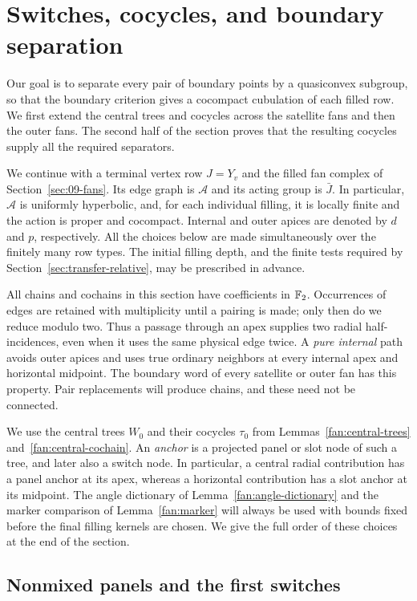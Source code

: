 \section{Switches, cocycles, and boundary separation}\label{sec:10-boundary}

Our goal is to separate every pair of boundary points by a quasiconvex
subgroup, so that the boundary criterion gives a cocompact cubulation
of each filled row. We first extend the central trees and cocycles
across the satellite fans and then the outer fans. The second half
of the section proves that the resulting cocycles supply all the
required separators.

We continue with a terminal vertex row $J=Y_v$ and the filled fan complex of
Section~\ref{sec:09-fans}. Its edge graph is $\mathcal A$ and its acting group
is $\bar J$. In particular, $\mathcal A$ is uniformly hyperbolic, and, for each
individual filling, it is locally finite and the action is proper and
cocompact. Internal and outer apices are denoted by $d$ and $p$, respectively.
All the choices below are made simultaneously over the finitely many row
types. The initial filling depth, and the finite tests required by
Section~\ref{sec:transfer-relative}, may be prescribed in advance.

All chains and cochains in this section have coefficients in $\mathbb F_2$.
Occurrences of edges are retained with multiplicity until a pairing is made;
only then do we reduce modulo two. Thus a passage through an apex supplies two
radial half-incidences, even when it uses the same physical edge twice. A
\emph{pure internal} path avoids outer apices and uses true ordinary neighbors
at every internal apex and horizontal midpoint. The boundary word of every
satellite or outer fan has this property. Pair replacements will produce
chains, and these need not be connected.

We use the central trees $W_0$ and their cocycles $\tau_0$ from
Lemmas~\ref{fan:central-trees} and~\ref{fan:central-cochain}. An
\emph{anchor} is a projected panel or slot node of such a tree, and later also
a switch node. In particular, a central radial contribution has a panel
anchor at its apex, whereas a horizontal contribution has a slot anchor at
its midpoint. The angle dictionary of Lemma~\ref{fan:angle-dictionary} and
the marker comparison of Lemma~\ref{fan:marker} will always be used with
bounds fixed before the final filling kernels are chosen. We give the full
order of these choices at the end of the section.

\subsection{Nonmixed panels and the first switches}

